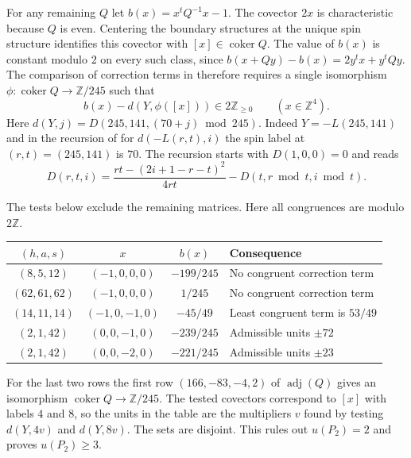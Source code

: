 For any remaining $Q$ let $b(x)=x^tQ^{-1}x-1$. The covector $2x$ is characteristic because $Q$ is even. Centering the boundary structures at the unique spin structure identifies this covector with $[x]\in\operatorname{coker}Q$. The value of $b(x)$ is constant modulo $2$ on every such class, since $b(x+Qy)-b(x)=2y^tx+y^tQy$. The comparison of correction terms in \cite[Theorem~1]{Owens} therefore requires a single isomorphism $\phi\colon\operatorname{coker}Q\to\mathbb{Z}/245$ such that
\[
 b(x)-d(Y,\phi([x]))\in2\mathbb Z_{\geq0}\qquad(x\in\mathbb Z^4).
\]
Here $d(Y,j)=D(245,141,(70+j)\bmod245)$. Indeed $Y=-L(245,141)$ and in the recursion of \cite[Proposition~4.8]{OSz} for $d(-L(r,t),i)$ the spin label at $(r,t)=(245,141)$ is $70$. The recursion starts with $D(1,0,0)=0$ and reads
\[
 D(r,t,i)=\frac{rt-(2i+1-r-t)^2}{4rt}
           -D(t,r\bmod t,i\bmod t).
\]
\begin{samepage}
The tests below exclude the remaining matrices. Here all congruences are modulo $2\mathbb Z$.
\begin{center}
\begin{tabular}{@{}c c c l@{}}
\toprule
$(h,a,s)$ & $x$ & $b(x)$ & Consequence \\
\midrule
$(8,5,12)$ & $(-1,0,0,0)$  & $-199/245$ & No congruent correction term \\
$(62,61,62)$ & $(-1,0,0,0)$  & $1/245$ & No congruent correction term \\
$(14,11,14)$ & $(-1,0,-1,0)$ & $-45/49$ & Least congruent term is $53/49$ \\
$(2,1,42)$ & $(0,0,-1,0)$  & $-239/245$ & Admissible units $\pm72$ \\
$(2,1,42)$ & $(0,0,-2,0)$  & $-221/245$ & Admissible units $\pm23$ \\
\bottomrule
\end{tabular}
\end{center}
\end{samepage}
For the last two rows the first row $(166,-83,-4,2)$ of $\operatorname{adj}(Q)$ gives an isomorphism $\operatorname{coker}Q\to\mathbb Z/245$. The tested covectors correspond to $[x]$ with labels $4$ and $8$, so the units in the table are the multipliers $v$ found by testing $d(Y,4v)$ and $d(Y,8v)$. The sets are disjoint. This rules out $u(P_2)=2$ and proves $u(P_2)\geq3$.
